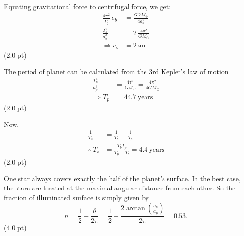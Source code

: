 Equating gravitational force to centrifugal force, we get:
\begin{align*}
\frac{4\pi^2}{T_b^2}\,a_b &= \frac{G\,2M_\odot}{4a_b^2}\\
\frac{T_b^2}{a_b^3} &= 2\,\frac{4\pi^2}{GM_\odot}\\
\Longrightarrow a_b &= 2\ \mathrm{au}.
\end{align*}
\hfill(2.0 pt)

The period of planet can be calculated from the 3rd Kepler's law of motion
\begin{align*}
\frac{T_p^2}{a_p^3} &= \frac{4\pi^2}{GM_\Sigma} = \frac{4\pi^2}{4GM_\odot}\\
\Longrightarrow T_p &= 44.7\ \mathrm{years}
\end{align*}
\hfill(2.0 pt)

Now,
\begin{align*}
\frac{1}{T_s} &= \frac{1}{T_b} - \frac{1}{T_p}\\
\therefore\ T_s &= \frac{T_b T_p}{T_p - T_b} = 4.4\ \mathrm{years}
\end{align*}
\hfill(2.0 pt)

One star always covers exactly the half of the planet's surface. In the best
case, the stars are located at the maximal angular distance from each other.
So the fraction of illuminated surface is simply given by
\[ n = \frac{1}{2} + \frac{\theta}{2\pi}
     = \frac{1}{2} + \frac{2\arctan\!\left(\frac{a_b}{a_p}\right)}{2\pi}
     = 0.53. \]
\hfill(4.0 pt)
